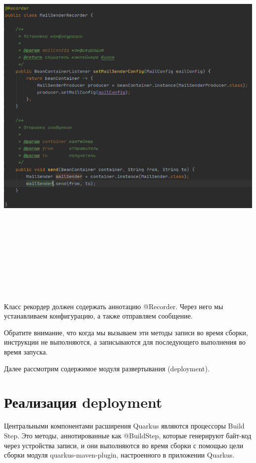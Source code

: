 \documentclass[russian,11pt]{article}
\begin{document}
\paragraph{\includegraphics[width=\textwidth, height=18cm]{8}}
~

	Класс рекордер должен содержать аннотацию @Recorder. Через него мы устанавливаем конфигурацию, а также отправляем сообщение.
	
	Обратите внимание, что когда мы вызываем эти методы записи во время сборки, инструкции не выполняются, а записываются для последующего выполнения во время запуска.
	
Далее рассмотрим содержимое модуля развертывания (deployment).

\section{Реализация deployment}

Центральными компонентами расширения Quarkus являются процессоры Build Step. Это методы, аннотированные как @BuildStep, которые генерируют байт-код через устройства записи, и они выполняются во время сборки с помощью цели сборки модуля quarkus-maven-plugin, настроенного в приложении Quarkus.
\end{document}
